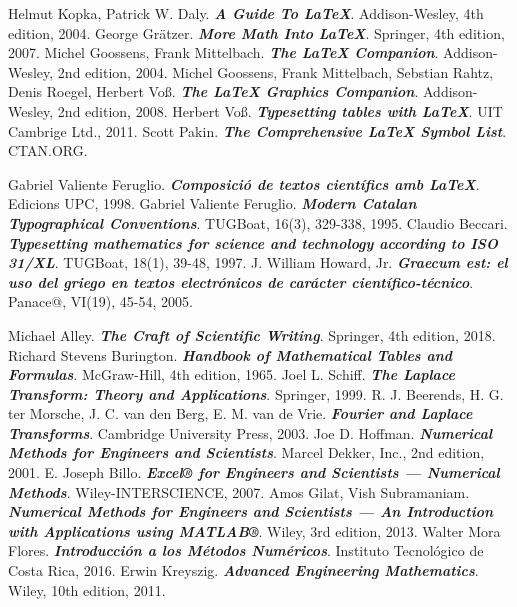 \begin{thebibliography}{99}


     Helmut Kopka, Patrick W. Daly. \textbf{\textit{A Guide To \LaTeX}}.  Addison-Wesley, 4th edition, 2004.
     George Grätzer. \textbf{\textit{More Math Into \LaTeX}}.  Springer, 4th edition, 2007.
     Michel Goossens, Frank Mittelbach. \textbf{\textit{The \LaTeX{} Companion}}.  Addison-Wesley, 2nd edition, 2004.
     Michel Goossens, Frank Mittelbach, Sebstian Rahtz, Denis Roegel, Herbert Voß. \textbf{\textit{The \LaTeX{} Graphics Companion}}.  Addison-Wesley, 2nd edition, 2008.
     Herbert Voß. \textbf{\textit{Typesetting tables with \LaTeX{}}}.  UIT Cambrige Ltd., 2011.
     Scott Pakin. \textbf{\textit{The Comprehensive \LaTeX{} Symbol List}}. CTAN.ORG.

     Gabriel Valiente Feruglio. \textbf{\textit{Composició de textos científics amb \LaTeX}}.  Edicions UPC, 1998.
     Gabriel Valiente Feruglio. \textbf{\textit{Modern Catalan Typographical Conventions}}.  TUGBoat, 16(3), 329-338, 1995.
     Claudio Beccari. \textbf{\textit{Typesetting mathematics for science and technology according to ISO 31/XL}}.  TUGBoat, 18(1), 39-48, 1997.
     J. William Howard, Jr. \textbf{\textit{Graecum est: el uso del griego en textos electrónicos de carácter científico-técnico}}.  Panace@, VI(19), 45-54, 2005.

	 Michael Alley. \textbf{\textit{The Craft of Scientific Writing}}. Springer, 4th edition, 2018.
     Richard Stevens Burington. \textbf{\textit{Handbook of Mathematical Tables and Formulas}}.  McGraw-Hill, 4th edition, 1965.
     Joel L. Schiff. \textbf{\textit{The Laplace Transform: Theory and Applications}}.  Springer, 1999.
     R. J. Beerends, H. G. ter Morsche, J. C. van den Berg, E. M. van de Vrie. \textbf{\textit{Fourier and Laplace Transforms}}.  Cambridge University Press, 2003.
     Joe D. Hoffman. \textbf{\textit{Numerical Methods for Engineers and Scientists}}.  Marcel Dekker, Inc., 2nd edition, 2001.
     E. Joseph Billo. \textbf{\textit{Excel® for Engineers and Scientists --- Numerical Methods}}.  Wiley-INTERSCIENCE, 2007.
     Amos Gilat, Vish Subramaniam. \textbf{\textit{Numerical Methods for Engineers and Scientists ---
        An Introduction with Applications using MATLAB®}}.  Wiley, 3rd edition, 2013.
     Walter Mora Flores. \textbf{\textit{Introducción a los Métodos Numéricos}}.  Instituto Tecnológico de Costa Rica, 2016.
      Erwin Kreyszig. \textbf{\textit{Advanced Engineering Mathematics}}.  Wiley, 10th edition, 2011.


\end{thebibliography}
